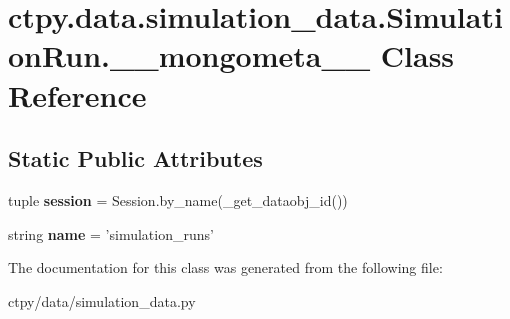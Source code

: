 \hypertarget{classctpy_1_1data_1_1simulation__data_1_1_simulation_run_1_1____mongometa____}{\section{ctpy.\-data.\-simulation\-\_\-data.\-Simulation\-Run.\-\_\-\-\_\-mongometa\-\_\-\-\_\- Class Reference}
\label{classctpy_1_1data_1_1simulation__data_1_1_simulation_run_1_1____mongometa____}
}
\subsection*{Static Public Attributes}
\begin{DoxyCompactItemize}
\item 
\hypertarget{classctpy_1_1data_1_1simulation__data_1_1_simulation_run_1_1____mongometa_____a7bf4abc9c23740c387c485c26245583a}{tuple {\bfseries session} = Session.\-by\-\_\-name(\-\_\-get\-\_\-dataobj\-\_\-id())}\label{classctpy_1_1data_1_1simulation__data_1_1_simulation_run_1_1____mongometa_____a7bf4abc9c23740c387c485c26245583a}

\item 
\hypertarget{classctpy_1_1data_1_1simulation__data_1_1_simulation_run_1_1____mongometa_____a7002bda020b8985ac0f1489a1a90743a}{string {\bfseries name} = 'simulation\-\_\-runs'}\label{classctpy_1_1data_1_1simulation__data_1_1_simulation_run_1_1____mongometa_____a7002bda020b8985ac0f1489a1a90743a}

\end{DoxyCompactItemize}


The documentation for this class was generated from the following file\-:\begin{DoxyCompactItemize}
\item 
ctpy/data/simulation\-\_\-data.\-py\end{DoxyCompactItemize}
